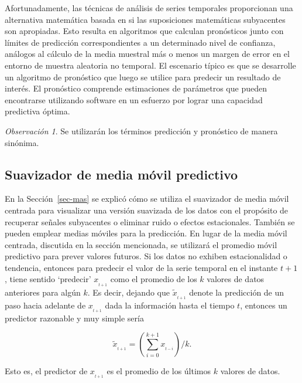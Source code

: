\documentclass[
  us-letterpaper,
]{scrreprt}
\theoremstyle{plain}
\theoremstyle{definition}
\theoremstyle{definition}
\theoremstyle{plain}
\theoremstyle{remark}
\newtheorem*{remark}{Observación}
\begin{document}
Afortunadamente, las técnicas de análisis de series temporales
proporcionan una alternativa matemática basada en si las suposiciones
matemáticas subyacentes son apropiadas. Esto resulta en algoritmos que
calculan pronósticos junto con límites de predicción correspondientes a
un determinado nivel de confianza, análogos al cálculo de la media
muestral más o menos un margen de error en el entorno de muestra
aleatoria no temporal. El escenario típico es que se desarrolle un
algoritmo de pronóstico que luego se utilice para predecir un resultado
de interés. El pronóstico comprende estimaciones de parámetros que
pueden encontrarse utilizando software en un esfuerzo por lograr una
capacidad predictiva óptima.

\begin{remark}
Se utilizarán los términos predicción y pronóstico de manera sinónima.
\end{remark}

\subsection{Suavizador de media móvil
predictivo}\label{suavizador-de-media-muxf3vil-predictivo}

En la Sección~\ref{sec-mas} se explicó cómo se utiliza el suavizador de
media móvil centrada para visualizar una versión suavizada de los datos
con el propósito de recuperar señales subyacentes o eliminar ruido o
efectos estacionales. También se pueden emplear medias móviles para la
predicción. En lugar de la media móvil centrada, discutida en la sección
mencionada, se utilizará el promedio móvil predictivo para prever
valores futuros. Si los datos no exhiben estacionalidad o tendencia,
entonces para predecir el valor de la serie temporal en el instante
\(t+1\), tiene sentido `predecir' \(x_{_{t+1}}\) como el promedio de los
\(k\) valores de datos anteriores para algún \(k\). Es decir, dejando
que \(\tilde{x}_{_{t+1}}\) denote la predicción de un paso hacia
adelante de \(x_{_{t+1}}\) dada la información hasta el tiempo \(t\),
entonces un predictor razonable y muy simple sería

\[
\tilde{x}_{_{t+1}}=\left(\sum\limits_{i=0}^{k+1}x_{_{t-i}}\right)/k.
\]

Esto es, el predictor de \(x_{_{t+1}}\) es el promedio de los últimos
\(k\) valores de datos.
\end{document}
